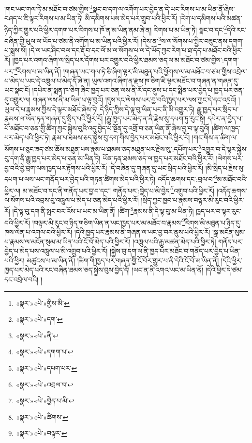 །གང་ཡང་གལ་ཏེ་མ་མཐོང་བ་ཙམ་གྱིས་\footnote{«སྣར་»«པེ་»གྱིས་མི་}སྣང་བ་དག་ལ་འགོག་པར་བྱེད་ན་དེ་ཡང་རིགས་པ་མ་ཡིན་ནོ་ཞེས་བཤད་པ་ཇི་ལྟར་རིགས་པ་མ་ཡིན་ཏེ། མི་དམིགས་པས་མེད་པར་གྲུབ་པའི་ཕྱིར་རོ། །རེག་པ་དམིགས་པའི་མཚན་ཉིད་ཀྱིར་གྱུར་པའི་ཕྱིར་དགག་པར་རིགས་པ་ཁོ་ན་མ་ཡིན་ནམ་ཞེ་ན། རིགས་པ་མ་ཡིན་ཏེ། སྣང་བ་དང་\footnote{«སྣར་»«པེ་»དག་}དེའི་རང་བཞིན་གྱི་ཡུལ་ལ་ཡོད་པ་ཙམ་ནི་འགོག་པ་མ་ཡིན་པའི་ཕྱིར་རོ། །དེས་ན་\footnote{«སྣར་»«པེ་»ནི་}ས་ལ་སོགས་པ་སྤྱིར་བཟུང་ནས་དགག་པ་སྨྲས་སོ། །དེ་ལ་ཡང་ཤིང་བལ་དང་རྡོ་བ་དང་ལོ་མ་ལ་སོགས་པ་ལ་དེ་ཡོད་ཀྱང་རེག་པ་ཐ་དད་པ་མཐོང་བའི་ཕྱིར་རོ། །ཁྱད་པར་འགའ་ཞིག་ལ་སྲིད་པར་དོགས་པར་འགྱུར་བའི་ཕྱིར་ཐམས་ཅད་ལ་མ་མཐོང་བ་ཙམ་གྱིས་:དགག་པར་\footnote{«སྣར་»«པེ་»དགག་པ་}རིགས་པ་མ་ཡིན་ནོ། །གཞན་ཡང་གལ་ཏེ་ཅི་ཞིག་ལྟར་མི་མཐུན་པའི་ཕྱོགས་ལ་མ་མཐོང་བ་ཙམ་གྱིས་འབྲེལ་པ་མེད་པ་ཡང་དེ་འཁྲུལ་པ་མེད་དོ་ཞེ་ན། ཡུལ་འགའ་ཞིག་ན་རྫས་ཁ་ཅིག་ཇི་ལྟར་མཐོང་བ་གཞན་ན་གཞན་དུ་ཡང་སྣང་ངོ། །དཔེར་ན་སྨན་ཁ་ཅིག་ཞིང་ཁྱད་པར་ཅན་ལས་ནི་རོ་དང་ནུས་པ་དང་སྨིན་པར་བྱེད་པ་ཁྱད་པར་ཅན་དུ་འགྱུར་ལ། གཞན་ལས་ནི་མ་ཡིན་པ་ལྟ་བུའོ། །དུས་དང་ལེགས་པར་བྱ་བའི་ཁྱད་པར་ལས་ཀྱང་དེ་དང་འདྲའོ། །ཡུལ་དེ་པ་རྣམས་ཀྱིས་དེ་ལྟར་མཐོང་ཞེས་ཏེ། དེ་ཉིད་ཀྱིས་དེ་ལྟ་བུ་ཡིན་པར་ནི་མི་འགྱུར་ཏེ། རྒྱུ་ཁྱད་པར་སྲིད་པ་རྣམས་ལ་ཡོན་ཏན་གཞན་དུ་སྲིད་པའི་ཕྱིར་རོ། །རྒྱུ་ཁྱད་པར་མེད་ན་ནི་རྗེས་སུ་དཔག་ཏུ་རུང་སྟེ། དཔེར་ན་བྱེད་པ་པོ་མཐོང་བ་ཅན་གྱི་ཚིག་ཀྱང་སྐྱེས་བུའི་འདུ་བྱེད་པ་སྔོན་དུ་འགྲོ་བ་ཅན་ཡིན་ནོ་ཞེས་བྱ་བ་ལྟ་བུའོ། །ཚིག་ལ་ཁྱད་པར་མེད་པའི་ཕྱིར་ཏེ། རྣམ་པ་ཐམས་ཅད་སྐྱེས་བུ་དག་གིས་བྱེད་པར་མཐོང་བའི་ཕྱིར་རོ། །གང་གིས་ན་ཚིག་ལ་སོགས་པ་ཅུང་ཟད་ཙམ་ཆོས་མཐུན་པས་རྣམ་པ་ཐམས་ཅད་མཐུན་པར་རྗེས་སུ་:དཔོག་པར་\footnote{«སྣར་»«པེ་»དཔག་པར་}འགྱུར་བ་དེ་ལྟར་སྐྱེས་བུ་དག་ནི་རྒྱུ་ཁྱད་པར་མེད་པ་ཅན་མ་ཡིན་ཏེ། ཡོན་ཏན་ཐམས་ཅད་ལ་ཁྱད་པར་མཐོང་བའི་ཕྱིར་རོ། །ལེགས་པར་བྱ་བའི་བྱེ་བྲག་ལས་ཁྱད་པར་རྟོགས་པའི་ཕྱིར་རོ། །དེ་བཞིན་དུ་གཞན་དུ་ཡང་སྲིད་པའི་ཕྱིར་རོ། །མི་སྲིད་པ་རྗེས་སུ་དཔག་པ་ལས་ཡང་གནོད་པར་བྱེད་པའི་གཏན་ཚིགས་མེད་པའི་ཕྱིར་ཏེ། འདོད་ཆགས་དང་:བྲལ་བ་\footnote{«སྣར་»«པེ་»འབྲལ་བ་}མ་མཐོང་བའི་ཕྱིར་ལ། མ་མཐོང་བ་དང་ནི་གནོད་པར་བྱ་བ་དང་། གནོད་པར་:བྱེད་པ་མི་བྱེད་\footnote{«སྣར་»«པེ་»བྱེད་པ་མི་}འགྲུབ་པའི་ཕྱིར་རོ། །འདོད་ཆགས་ལ་སོགས་པའི་འབྲས་བུ་འཁྲུལ་པ་མེད་པ་ཅན་མེད་པའི་ཕྱིར་རོ། །སྲིད་ཀྱང་ཁྱབ་པ་རྣམས་བལྟར་མི་རུང་བའི་ཕྱིར་རོ། །དེ་ལྟ་བུ་དག་ནི་སྤང་བར་འོས་པ་ཡང་མ་ཡིན་ནོ། །ཚིག་\footnote{«སྣར་»«པེ་»ཚིགས་}རྣམས་ནི་དེ་ལྟ་བུ་མ་ཡིན་ཏེ། ཁྱད་པར་བ་ལྟར་རུང་བའི་ཕྱིར་རོ། །བལྟར་མི་རུང་བ་ཉིད་གཅིག་ཡིན་ན་ཡང་ཁྱད་པར་མ་མཐོང་བ་རྣམས་\footnote{«སྣར་»«པེ་»བལྟར་}རིགས་མི་མཐུན་པ་ཉིད་དུ་ཁས་ལེན་པ་འགལ་བའི་ཕྱིར་རོ། །དེའི་ཁྱད་པར་རྣམས་ནི་གཞན་ལ་ཡང་བྱ་བར་ནུས་པའི་ཕྱིར་རོ། །སྒྲ་མངོན་སུམ་པ་རྣམས་ལ་མངོན་སུམ་མ་ཡིན་པའི་ངོ་བོ་མེད་པའི་ཕྱིར་རོ། །འཁྲུལ་པའི་རྒྱུ་མཚན་མེད་པའི་ཕྱིར་ཏེ། གནོད་པར་བྱེད་པ་མེད་པས་འཁྲུལ་པ་མི་འགྲུབ་པའི་ཕྱིར་རོ། །སྐྱེས་བུ་དག་ལ་ནི་ཁྱད་པར་མཐོང་བ་གནོད་པར་བྱེད་པ་ཡིན་པའི་ཕྱིར། མཚུངས་པ་མ་ཡིན་ནོ། །ཚིག་གི་ཁྱད་པར་གཞན་གྱི་ངོ་བོར་གྱུར་པ་ནི་དེའི་ངོ་བོ་མ་ཡིན་ནོ། །དེའི་ཕྱིར་ཁྱད་པར་མེད་པའི་རང་བཞིན་ཐམས་ཅད་སྐྱེས་བུས་བྱེད་དོ། །ཡང་ན་ནི་འགའ་ཡང་མ་ཡིན་ནོ། །དེའི་ཕྱིར་དེ་ཙམ་དང་འབྲེལ་བའི། །
